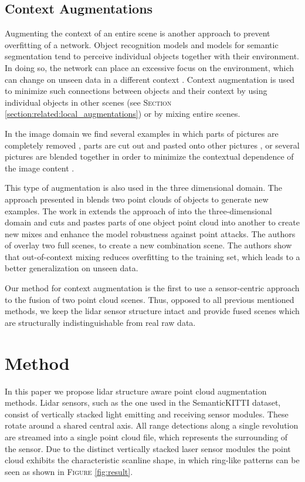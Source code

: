 \documentclass[letterpaper, 10 pt, conference]{ieeeconf}
\begin{document}
\subsection{Context Augmentations}
\label{section:related:fusion}
Augmenting the context of an entire scene is another approach to prevent overfitting of a network. Object recognition models and models for semantic segmentation tend to perceive individual objects together with their environment. In doing so, the network can place an excessive focus on the environment, which can change on unseen data in a different context \cite{rosenfeld2018elephant}\cite{nekrasov2021mix3d}. Context augmentation is used to minimize such connections between objects and their context by using individual objects in other scenes (see \textsc{Section} \ref{section:related:local_augmentations}) or by mixing entire scenes.

In the image domain we find several examples in which parts of pictures are completely removed \cite{devries2017improved}, parts are cut out and pasted onto other pictures \cite{yun2019cutmix}, or several pictures are blended together in order to minimize the contextual dependence of the image content \cite{zhang2017mixup}.

This type of augmentation is also used in the three dimensional domain. The approach presented in \cite{chen2020pointmixup} blends two point clouds of objects to generate new examples. The work in \cite{zhang2021pointcutmix} extends the approach of  \cite{yun2019cutmix} into the three-dimensional domain and cuts and pastes parts of one object point cloud into another to create new mixes and enhance the model robustness against point attacks. The authors of \cite{nekrasov2021mix3d} overlay two full scenes, to create a new combination scene. The authors show that out-of-context mixing reduces overfitting to the training set, which leads to a better generalization on unseen data.

Our method for context augmentation is the first to use a sensor-centric approach to the fusion of two point cloud scenes. Thus, opposed to all previous mentioned methods, we keep the lidar sensor structure intact and provide fused scenes which are structurally indistinguishable from real raw data.

\section{Method}
\label{section:method}
In this paper we propose lidar structure aware point cloud augmentation methods. Lidar sensors, such as the one used in the SemanticKITTI \cite{behley2019semantickitti} dataset, consist of vertically stacked light emitting and receiving sensor modules. These rotate around a shared central axis. All range detections along a single revolution are streamed into a single point cloud file, which represents the surrounding of the sensor. Due to the distinct vertically stacked laser sensor modules the point cloud exhibits the characteristic scanline shape, in which ring-like patterns can be seen as shown in \textsc{Figure} \ref{fig:result}. 
\end{document}
